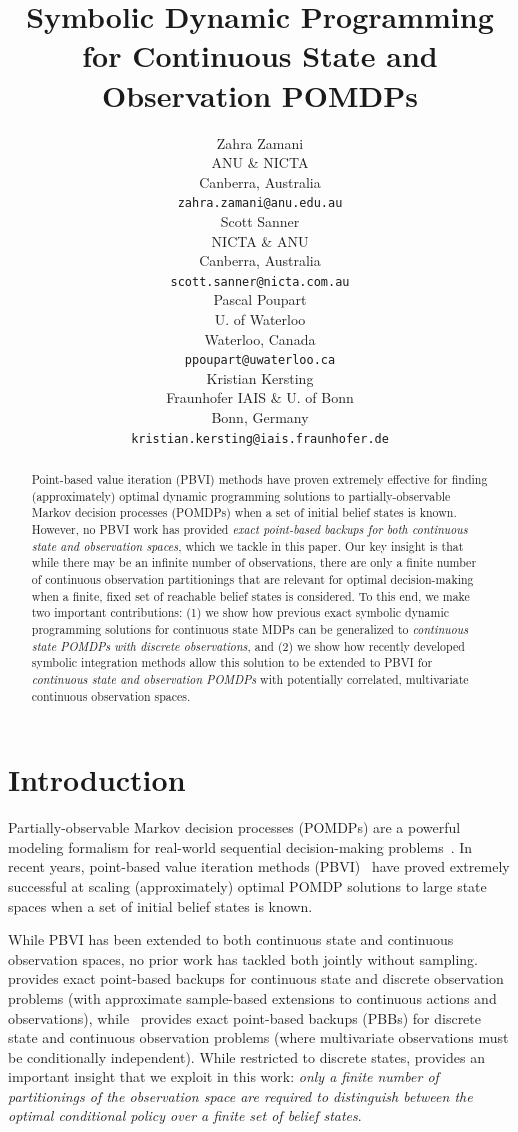 \documentclass{article} %
\title{Symbolic Dynamic Programming for Continuous State and Observation POMDPs}
\author
{
Zahra Zamani\\ %
ANU \& NICTA\\
Canberra, Australia\\
{\small \texttt{zahra.zamani@anu.edu.au}}\\
\And
Scott Sanner\\
NICTA \& ANU\\
Canberra, Australia\\
{\small \texttt{scott.sanner@nicta.com.au}}\\
\AND
Pascal Poupart\\
U. of Waterloo\\
Waterloo, Canada\\
{\small \texttt{ppoupart@uwaterloo.ca}}\\
\And 
Kristian Kersting\\
Fraunhofer IAIS \& U. of Bonn\\
Bonn, Germany\\
{\small \texttt{kristian.kersting@iais.fraunhofer.de}}\\
}
\begin{document}
\maketitle

\begin{abstract}
Point-based value iteration (PBVI) methods have
proven extremely effective for finding
(approximately) optimal dynamic programming solutions to
partially-observable Markov decision processes (POMDPs) when a 
set of initial belief states is known.  However, no PBVI work has
provided \emph{exact point-based backups for both continuous state and
observation spaces}, which we tackle in this paper.  Our key insight is
that while there may be an infinite number of observations,
there are only a finite number of continuous observation partitionings
that are relevant for optimal decision-making when a finite, fixed set
of reachable belief states is considered.  To this end, we make two
important contributions: (1) we show how previous exact symbolic
dynamic programming solutions for continuous state MDPs can be
generalized to \emph{continuous state POMDPs with discrete observations}, and
(2) we show how recently developed symbolic integration methods
allow this solution to be extended 
to PBVI for \emph{continuous state and observation POMDPs} with
potentially correlated, multivariate continuous observation spaces.
\end{abstract}

\section{Introduction} %

Partially-observable Markov decision processes (POMDPs) are a powerful
modeling formalism for real-world sequential decision-making
problems~\cite{kaebling}.  In recent years, point-based value
iteration methods (PBVI)~\cite{pbvi_jair06,hsvi2,Perseus,gapmin} have proved
extremely successful at scaling (approximately) optimal POMDP
solutions to large state spaces when a set of initial belief states is
known.

While PBVI has been extended to both continuous state and continuous
observation spaces, no prior work has tackled both jointly without sampling.
\cite{Perseus_cont} provides exact point-based backups for continuous
state and discrete observation problems (with approximate sample-based
extensions to continuous actions and observations),
while~\cite{pascal_ijcai05} provides exact point-based backups (PBBs)
for discrete state and continuous observation problems (where
multivariate observations must be conditionally independent).  While
restricted to discrete states, \cite{pascal_ijcai05} provides an
important insight that we exploit in this work: \emph{only a finite
  number of partitionings of the observation space are required to
  distinguish between the optimal conditional policy over a finite set
  of belief states}.
\end{document}
